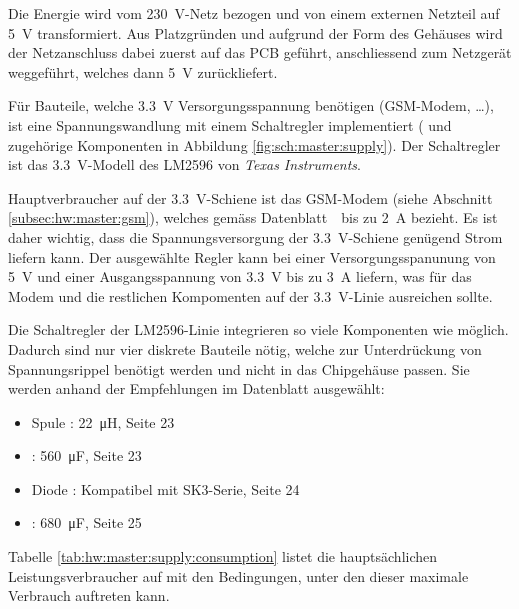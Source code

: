 Die  Energie wird  vom  \SI{230}{\volt}-Netz bezogen  und  von einem  externen
Netzteil auf \SI{5}{\volt} transformiert. Aus  Platzgr\"unden und aufgrund der
Form des Geh\"auses wird der Netzanschluss dabei zuerst auf das PCB gef\"uhrt,
anschliessend  zum   Netzger\"at  weggef\"uhrt,  welches   dann  \SI{5}{\volt}
zur\"uckliefert.

F\"ur   Bauteile,  welche   \SI{3.3}{\volt}  Versorgungsspannung   ben\"otigen
(GSM-Modem,  \ldots),  ist  eine   Spannungswandlung  mit  einem  Schaltregler
implementiert   (   und   zugeh\"orige  Komponenten   in   Abbildung
\ref{fig:sch:master:supply}). Der Schaltregler  ist das \SI{3.3}{\volt}-Modell
des LM2596 von \emph{Texas Instruments}.

Hauptverbraucher   auf   der   \SI{3.3}{\volt}-Schiene   ist   das   GSM-Modem
(siehe     Abschnitt     \ref{subsec:hw:master:gsm}),     welches     gem\"ass
Datenblatt~\cite{ref:sim900:1}~bis   zu    \SI{2}{\ampere}   bezieht. Es   ist
daher  wichtig,  dass   die  Spannungsversorgung  der  \SI{3.3}{\volt}-Schiene
gen\"ugend  Strom  liefern  kann. Der  ausgew\"ahlte  Regler  kann  bei  einer
Versorgungsspanunung   von  \SI{5}{\volt}   und  einer   Ausgangsspannung  von
\SI{3.3}{\volt} bis  zu \SI{3}{\ampere} liefern,  was f\"ur das Modem  und die
restlichen Kompomenten auf der \SI{3.3}{\volt}-Linie ausreichen sollte.

Die  Schaltregler  der  LM2596-Linie  integrieren  so  viele  Komponenten  wie
m\"oglich. Dadurch  sind  nur  vier  diskrete  Bauteile  n\"otig,  welche  zur
Unterdr\"uckung  von  Spannungsrippel  ben\"otigt  werden  und  nicht  in  das
Chipgeh\"ause  passen. Sie  werden  anhand   der  Empfehlungen  im  Datenblatt
\cite{ref:lm2596} ausgew\"ahlt:

\begin{itemize}
    \tightlist
    \item
        Spule : \SI{22}{\micro\henry}, Seite 23
    \item
        : \SI{560}{\micro\farad}, Seite 23
    \item
        Diode : Kompatibel mit SK3-Serie, Seite 24
    \item
        : \SI{680}{\micro\farad}, Seite 25
\end{itemize}

Tabelle  \ref{tab:hw:master:supply:consumption}  listet die  haupts\"achlichen
Leistungsverbraucher  auf  mit  den  Bedingungen, unter  den  dieser  maximale
Verbrauch auftreten kann.

